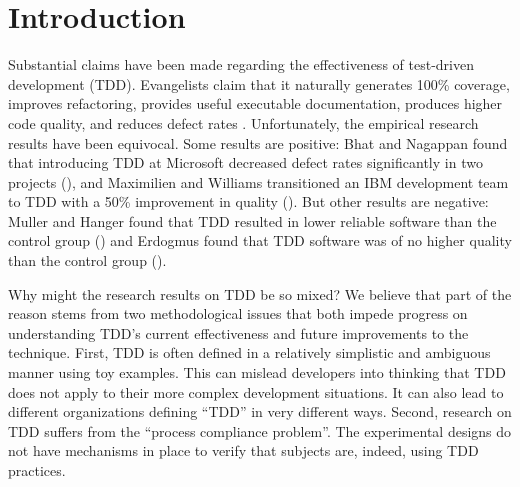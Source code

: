 \documentclass[smallextended]{svjour3}     %
\begin{document}
\section{Introduction}
\label{intro}

Substantial claims have been made regarding the effectiveness of
test-driven development (TDD). Evangelists claim that it naturally
generates 100\% coverage, improves refactoring, provides useful executable
documentation, produces higher code quality, and reduces defect rates
\cite{Beck:03}.  Unfortunately, the empirical research results
have been equivocal.  Some results are positive: Bhat and Nagappan
found that introducing TDD at Microsoft decreased defect rates significantly in two projects
(\cite{Bhat:06}), and Maximilien and Williams transitioned an IBM development
team to TDD with a 50\% improvement in quality (\cite{Maximilien:03}). But other
results are negative: Muller and Hanger found that TDD resulted in lower
reliable software than the control group (\cite{Muller:02}) and Erdogmus
found that TDD software was of no higher quality than the control group
(\cite{Erdogmus:05}).

Why might the research results on TDD be so mixed?  We believe that part of
the reason stems from two methodological issues that both impede progress
on understanding TDD's current effectiveness and future improvements to the
technique. First, TDD is often defined in a relatively simplistic and
ambiguous manner using toy examples.  This can mislead developers into
thinking that TDD does not apply to their more complex development
situations. It can also lead to different organizations defining ``TDD'' in
very different ways. Second, research on TDD suffers from the ``process
compliance problem''.  The experimental designs do not have mechanisms in
place to verify that subjects are, indeed, using TDD practices.

\end{document}
